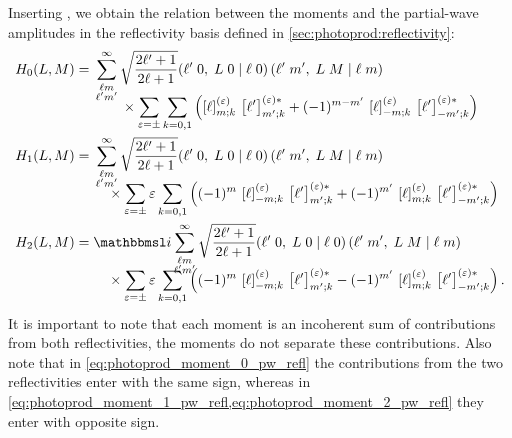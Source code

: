 Inserting
, we
obtain the relation between the moments and the partial-wave
amplitudes in the reflectivity basis defined in
\cref{sec:photoprod:reflectivity}:
\begin{align}
  \label{eq:photoprod_moment_0_pw_refl}
  H_0(L, M)
  ={}& \begin{multlined}[t][0.8\columnwidth]
    \sum_{\substack{\ell m \\ \ell' m'}}^\infty \sqrt{\frac{2 \ell' + 1}{2 \ell + 1}}
    \clebsch{\ell'}{0}{L}{0}{\ell}{0}\, \clebsch{\ell'}{m'}{L}{M}{\ell}{m} \\[-2ex]
    \shoveleft{\hfill \times%
      \sum_{\refl = \pm} \sum_{k = 0, 1} \rBrk[2]{\sBrk{\ell}^{(\refl)}_{m; k}\, \sBrk{\ell'}^{(\refl) *}_{m'; k}
      + (-1)^{m - m'}\, \sBrk{\ell}^{(\refl)}_{{-m}; k}\, \sBrk{\ell'}^{(\refl) *}_{{-m'}; k}}
    }
  \end{multlined}
  \\
  \label{eq:photoprod_moment_1_pw_refl}
  H_1(L, M)
  ={}& \begin{multlined}[t][0.8\columnwidth]
    \sum_{\substack{\ell m \\ \ell' m'}}^\infty \sqrt{\frac{2 \ell' + 1}{2 \ell + 1}}
    \clebsch{\ell'}{0}{L}{0}{\ell}{0}\, \clebsch{\ell'}{m'}{L}{M}{\ell}{m} \\[-2ex]
    \shoveleft{\hfill \times%
      \sum_{\refl = \pm} \refl \sum_{k = 0, 1} \rBrk[2]{(-1)^m\, \sBrk{\ell}^{(\refl)}_{{-m}; k}\, \sBrk{\ell'}^{(\refl) *}_{m'; k}
      + (-1)^{m'}\, \sBrk{\ell}^{(\refl)}_{m; k}\, \sBrk{\ell'}^{(\refl) *}_{{-m'}; k}}
    }
  \end{multlined}
  \\
  \label{eq:photoprod_moment_2_pw_refl}
  H_2(L, M)
  ={}& \begin{multlined}[t][0.8\columnwidth]
    \imag \sum_{\substack{\ell m \\ \ell' m'}}^\infty \sqrt{\frac{2 \ell' + 1}{2 \ell + 1}}
    \clebsch{\ell'}{0}{L}{0}{\ell}{0}\, \clebsch{\ell'}{m'}{L}{M}{\ell}{m} \\[-2ex]
    \shoveleft{\hfill \times%
      \sum_{\refl = \pm} \refl \sum_{k = 0, 1} \rBrk[2]{(-1)^m\, \sBrk{\ell}^{(\refl)}_{{-m}; k}\, \sBrk{\ell'}^{(\refl) *}_{m'; k}
      - (-1)^{m'}\, \sBrk{\ell}^{(\refl)}_{m; k}\, \sBrk{\ell'}^{(\refl) *}_{{-m'}; k}}
    }.
  \end{multlined}
\end{align}
It is important to note that each moment is an incoherent sum of
contributions from both reflectivities, \ie the moments do not
separate these contributions.  Also note that in
\cref{eq:photoprod_moment_0_pw_refl} the contributions from the two
reflectivities enter with the same sign, whereas in
\cref{eq:photoprod_moment_1_pw_refl,eq:photoprod_moment_2_pw_refl}
they enter with opposite sign.

